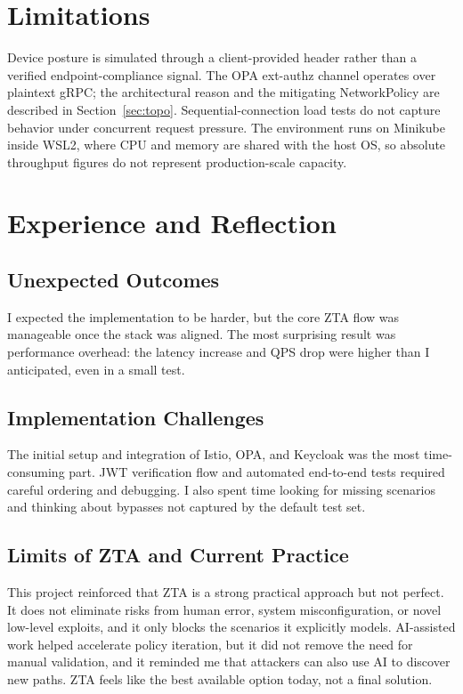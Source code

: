 \documentclass[conference]{IEEEtran}
\begin{document}
\vspace{4pt}
\section{Limitations}
Device posture is simulated through a client-provided header rather than a verified
endpoint-compliance signal. The OPA ext-authz channel operates over plaintext gRPC;
the architectural reason and the mitigating NetworkPolicy are described in
Section~\ref{sec:topo}. Sequential-connection load tests do not capture behavior under
concurrent request pressure. The environment runs on Minikube inside WSL2, where CPU
and memory are shared with the host OS, so absolute throughput figures do not represent
production-scale capacity.

\vspace{4pt}
\section{Experience and Reflection}
\subsection{Unexpected Outcomes}
I expected the implementation to be harder, but the core ZTA flow was manageable once
the stack was aligned. The most surprising result was performance overhead: the
latency increase and QPS drop were higher than I anticipated, even in a small test.

\subsection{Implementation Challenges}
The initial setup and integration of Istio, OPA, and Keycloak was the most time-consuming part. JWT verification flow and automated end-to-end tests required careful
ordering and debugging. I also spent time looking for missing scenarios and thinking
about bypasses not captured by the default test set.

\subsection{Limits of ZTA and Current Practice}
This project reinforced that ZTA is a strong practical approach but not perfect. It
does not eliminate risks from human error, system misconfiguration, or novel low-level
exploits, and it only blocks the scenarios it explicitly models. AI-assisted work
helped accelerate policy iteration, but it did not remove the need for manual
validation, and it reminded me that attackers can also use AI to discover new paths.
ZTA feels like the best available option today, not a final solution.
\end{document}
